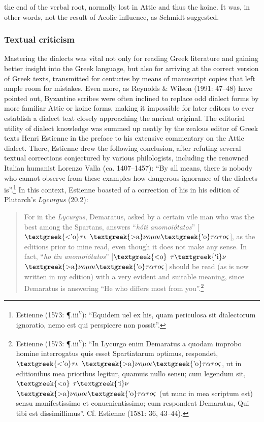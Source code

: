 the end of the verbal root, normally lost in Attic and thus the koine. It was, in other words, not the result of Aeolic influence, as Schmidt suggested.

\subsubsection{Textual criticism}
\hypertarget{Toc19704822}{}
Mastering the dialects was vital not only for reading Greek literature and gaining better insight into the Greek language, but also for arriving at the correct version of Greek texts, transmitted for centuries by means of manuscript copies that left ample room for mistakes. Even more, as Reynolds \& Wilson (1991: 47–48) have pointed out, Byzantine scribes were often inclined to replace odd dialect forms by more familiar Attic or koine forms, making it impossible for later editors to ever establish a dialect text closely approaching the ancient original. The editorial utility of dialect knowledge was summed up neatly by the zealous editor of Greek texts Henri Estienne in the preface to his extensive commentary on the Attic dialect. There, Estienne drew the following conclusion, after refuting several textual corrections conjectured by various philologists, including the renowned Italian humanist Lorenzo Valla (ca. 1407–1457): “By all means, there is nobody who cannot observe from these examples how dangerous ignorance of the dialects is”.\footnote{Estienne (1573: ¶.iii\textsc{\textsuperscript{v}}): “Equidem uel ex his, quam periculosa sit dialectorum ignoratio, nemo est qui perspicere non possit”.} In this context, Estienne boasted of a correction of his in his edition of Plutarch’s \textit{Lycurgus} (20.2):

\begin{quote}
For in the \textit{Lycurgus}, Demaratus, asked by a certain vile man who was the best among the Spartans, answers “\textit{hóti} \textit{anomoiótatos}” [$\text{\textgreek{<'o}}\tau \iota $ $\text{\textgreek{>a}}\nu o\mu o\iota \text{\textgreek{'o}}\tau \alpha \tau o\varsigma $], as the editions prior to mine read, even though it does not make any sense. In fact, “\textit{ho} \textit{tìn} \textit{anomoiótatos}” [$\text{\textgreek{<o}}$ $\tau \text{\textgreek{`i}}\nu $ $\text{\textgreek{>a}}\nu o\mu o\iota \text{\textgreek{'o}}\tau \alpha \tau o\varsigma $] should be read (as is now written in my edition) with a very evident and suitable meaning, since Demaratus is answering “He who differs most from you”.\footnote{Estienne (1573: ¶.iii\textsc{\textsuperscript{v}}): “In Lycurgo enim Demaratus a quodam improbo homine interrogatus quis esset Spartiatarum optimus, respondet, $\text{\textgreek{<'o}}\tau \iota $ $\text{\textgreek{>a}}\nu o\mu o\iota \text{\textgreek{'o}}\tau \alpha \tau o\varsigma $, ut in editionibus mea prioribus legitur, quamuis nullo sensu; cum legendum sit, $\text{\textgreek{<o}}$ $\tau \text{\textgreek{`i}}\nu $ $\text{\textgreek{>a}}\nu o\mu o\iota \text{\textgreek{'o}}\tau \alpha \tau o\varsigma $ (ut nunc in mea scriptum est) sensu manifestissimo et conuenientissimo; cum respondeat Demaratus, Qui tibi est dissimillimus”. Cf. Estienne (1581: 36, 43–44).}
\end{quote}

